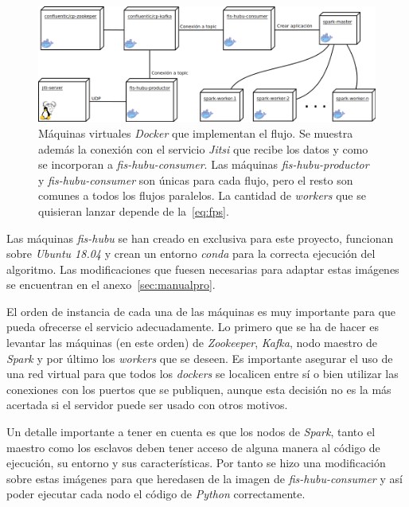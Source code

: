 \begin{figure}
	\centering
	\includegraphics[width=\textwidth]{img/DespliegueDocker.png}
	\caption[Máquinas virtuales \textit{Docker} que implementan el flujo.]{Máquinas virtuales \textit{Docker} que implementan el flujo. Se muestra además la conexión con el servicio \textit{Jitsi} que recibe los datos y como se incorporan a \textit{fis-hubu-consumer}. Las máquinas \textit{fis-hubu-productor} y \textit{fis-hubu-consumer} son únicas para cada flujo, pero el resto son comunes a todos los flujos paralelos. La cantidad de \textit{workers} que se quisieran lanzar depende de la~\autoref{eq:fps}.}
	\label{fig:despligueDocker}
\end{figure}

Las máquinas \textit{fis-hubu} se han creado en exclusiva para este proyecto, funcionan sobre \textit{Ubuntu 18.04} y crean un entorno \textit{conda} para la correcta ejecución del algoritmo. Las modificaciones que fuesen necesarias para adaptar estas imágenes se encuentran en el anexo~\ref{sec:manualpro}. 

El orden de instancia de cada una de las máquinas es muy importante para que pueda ofrecerse el servicio adecuadamente. Lo primero que se ha de hacer es levantar las máquinas (en este orden) de \textit{Zookeeper}, \textit{Kafka}, nodo maestro de \textit{Spark} y por último los \textit{workers} que se deseen. Es importante asegurar el uso de una red virtual para que todos los \textit{dockers} se localicen entre sí o bien utilizar las conexiones con los puertos que se publiquen, aunque esta decisión no es la más acertada si el servidor puede ser usado con otros motivos.

Un detalle importante a tener en cuenta es que los nodos de \textit{Spark}, tanto el maestro como los esclavos deben tener acceso de alguna manera al código de ejecución, su entorno y sus características. Por tanto se hizo una modificación sobre estas imágenes para que heredasen de la imagen de \textit{fis-hubu-consumer} y así poder ejecutar cada nodo el código de \textit{Python} correctamente.

